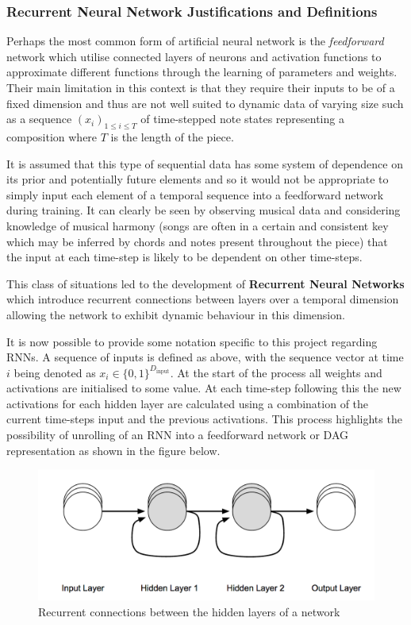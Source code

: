 \documentclass[12pt,]{article}
\begin{document}
\hypertarget{recurrent-neural-network-justifications-and-definitions}{%
\subsubsection{Recurrent Neural Network Justifications and
Definitions}\label{recurrent-neural-network-justifications-and-definitions}}

Perhaps the most common form of artificial neural network is the
\emph{feedforward} network which utilise connected layers of neurons and
activation functions to approximate different functions through the
learning of parameters and weights. Their main limitation in this
context is that they require their inputs to be of a fixed dimension and
thus are not well suited to dynamic data of varying size such as a
sequence \((x_i)_{1\le i\le T}\) of time-stepped note states
representing a composition where \(T\) is the length of the piece.

It is assumed that this type of sequential data has some system of
dependence on its prior and potentially future elements and so it would
not be appropriate to simply input each element of a temporal sequence
into a feedforward network during training. It can clearly be seen by
observing musical data and considering knowledge of musical harmony
(songs are often in a certain and consistent key which may be inferred
by chords and notes present throughout the piece) that the input at each
time-step is likely to be dependent on other time-steps.

This class of situations led to the development of \textbf{Recurrent
Neural Networks} which introduce recurrent connections between layers
over a temporal dimension allowing the network to exhibit dynamic
behaviour in this dimension.

It is now possible to provide some notation specific to this project
regarding RNNs. A sequence of inputs is defined as above, with the
sequence vector at time \(i\) being denoted as
\(x_i\in \{0,1\}^{D_{\text{input}}}\). At the start of the process all
weights and activations are initialised to some value. At each time-step
following this the new activations for each hidden layer are calculated
using a combination of the current time-steps input and the previous
activations. This process highlights the possibility of unrolling of an
RNN into a feedforward network or DAG representation as shown in the
figure below.

\begin{figure}
\centering
\includegraphics{Images/rnnrolled.png}
\caption{Recurrent connections between the hidden layers of a network}
\end{figure}
\end{document}
